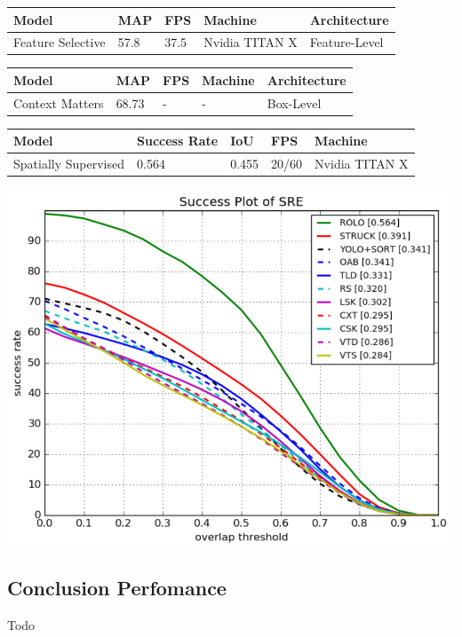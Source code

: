 \documentclass[conference]{IEEEtran}
\begin{document}
\begin{tabular}{ | p{2cm} | p{2em}| p{2em} | p{4em} | p{5em} | } 
 \hline
 Model & MAP & FPS & Machine & Architecture \\
 \hline
 Feature Selective \cite{b6} & 57.8 & 37.5 & Nvidia TITAN X & Feature-Level \\
 \hline
\end{tabular}

\begin{tabular}{ | p{2cm} | p{2em}| p{2em} | p{4em} | p{5em} | } 
 \hline
 Model & MAP & FPS & Machine & Architecture \\
 \hline
 Context Matters \cite{b4} & 68.73 & - & - & Box-Level \\
 \hline
\end{tabular}

\begin{tabular}{ | p{2cm} | p{3em}| p{2em} | p{4em} | p{4em} | } 
 \hline
 Model & Success Rate & IoU & FPS & Machine \\
 \hline
 Spatially Supervised \cite{b5} & 0.564 & 0.455 & 20/60 & Nvidia TITAN X \\
 \hline
\end{tabular}
\includegraphics[width=\columnwidth]{otb-challenge-results}

\subsection{Conclusion Perfomance}
Todo
\end{document}
